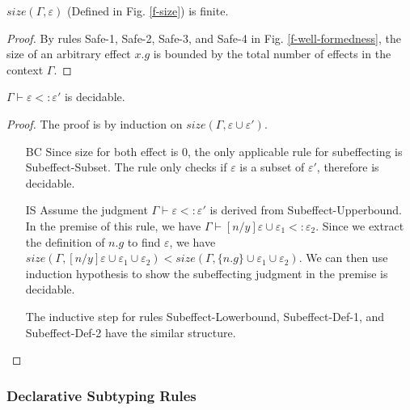\begin{lemma} $size(\Gamma, \varepsilon)$ (Defined in Fig. \ref{f-size}) is finite.
\begin{proof}
	By rules Safe-1, Safe-2, Safe-3, and Safe-4 in Fig. \ref{f-well-formedness}, the size of an arbitrary effect $x.g$ is bounded by the total number of effects in the context $\Gamma$.
\end{proof}

\begin{theorem}
$\Gamma \vdash \varepsilon <: \varepsilon'$ is decidable.
\begin{proof}
The proof is by induction on $size(\Gamma, \varepsilon \cup \varepsilon')$. 
\begin{itemize}
\item[BC]  Since size for both effect is 0, the only applicable rule for subeffecting is Subeffect-Subset. The rule only checks if $\varepsilon$ is a subset of $\varepsilon'$, therefore is decidable.
\item [IS] Assume the judgment $\Gamma \vdash \varepsilon <: \varepsilon'$ is derived from Subeffect-Upperbound. In the premise of this rule, we have $\Gamma \vdash [n/y]\varepsilon \cup \varepsilon_1 <: \varepsilon_2$. Since we extract the definition of $n.g$ to find $\varepsilon$, we have $size(\Gamma, [n/y]\varepsilon \cup \varepsilon_1 \cup \varepsilon_2) < size(\Gamma,  \{n.g\} \cup \varepsilon_1 \cup \varepsilon_2)$. We can then use induction hypothesis to show the subeffecting judgment in the premise is decidable.

The inductive step for rules Subeffect-Lowerbound, Subeffect-Def-1, and Subeffect-Def-2 have the similar structure.
\end{itemize}
\end{proof}
\end{theorem}
\end{lemma}

\subsubsection{Declarative Subtyping Rules}
\label{sec-effects-subtyping}

